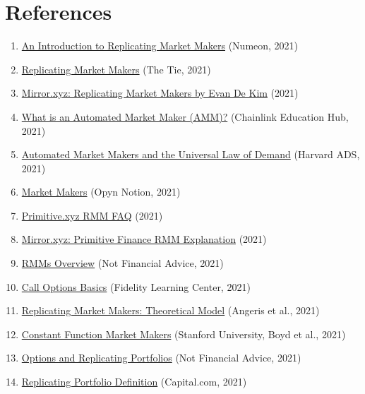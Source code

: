 \documentclass[12pt]{article}
\begin{document}
\section*{References}
\begin{enumerate}
    \renewcommand{\labelenumi}{[\Alph{enumi}]}
    \item \href{https://medium.com/numoen/an-introduction-to-replicating-market-makers-de5c44d3c558}{An Introduction to Replicating Market Makers} (Numeon, 2021)
    \item \href{https://www.thetie.io/insights/research/rmm/}{Replicating Market Makers} (The Tie, 2021)
    \item \href{https://mirror.xyz/evandekim.eth/aUULTZFwhJ9XsOZ6XIbAYl1iaSncDKpDwKazCemJlI8}{Mirror.xyz: Replicating Market Makers by Evan De Kim} (2021)
    \item \href{https://chain.link/education-hub/what-is-an-automated-market-maker-amm}{What is an Automated Market Maker (AMM)?} (Chainlink Education Hub, 2021)
    \item \href{https://ui.adsabs.harvard.edu/abs/2021arXiv210314769A/abstract}{Automated Market Makers and the Universal Law of Demand} (Harvard ADS, 2021)
    \item \href{https://opynopyn.notion.site/Market-Makers-4ca991796d8b452fa1358344f941f624}{Market Makers} (Opyn Notion, 2021)
    \item \href{https://library.primitive.xyz/faq/usage/rmm}{Primitive.xyz RMM FAQ} (2021)
    \item \href{https://primitive.mirror.xyz/Audtl29HY_rnhN4E2LwnP7-zjDcDGAyXZ4h3QpDeajg}{Mirror.xyz: Primitive Finance RMM Explanation} (2021)
    \item \href{https://not-financial-advice.notion.site/RMMs-c5c6b0d9e190404c94d66241178454da}{RMMs Overview} (Not Financial Advice, 2021)
    \item \href{https://www.fidelity.com/learning-center/investment-products/options/call-options-basics}{Call Options Basics} (Fidelity Learning Center, 2021)
    \item \href{https://angeris.github.io/papers/rmms.pdf}{Replicating Market Makers: Theoretical Model} (Angeris et al., 2021)
    \item \href{https://web.stanford.edu/~boyd/papers/pdf/cfmm.pdf}{Constant Function Market Makers} (Stanford University, Boyd et al., 2021)
    \item \href{https://not-financial-advice.notion.site/Options-364981cc38bf4c55b45976a715d79604}{Options and Replicating Portfolios} (Not Financial Advice, 2021)
    \item \href{https://capital.com/replicating-portfolio-definition}{Replicating Portfolio Definition} (Capital.com, 2021)
\end{enumerate}
\end{document}
